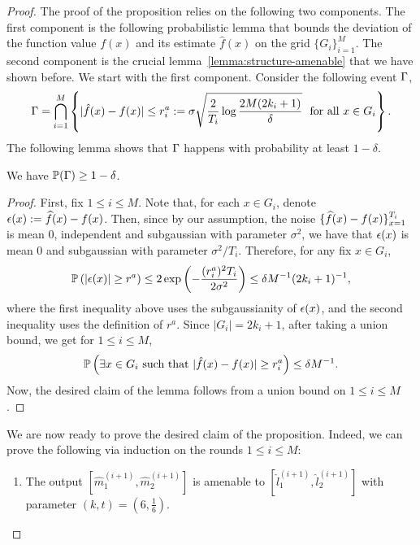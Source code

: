 \begin{proof}
The proof of the proposition relies on the following two components. The first 
component is the following probabilistic lemma that bounds the deviation of the 
function value $f(x)$ and its estimate $\hat{f}(x)$ on the grid $\{G_i\}_{i=1}^M$. 
The second component is the crucial lemma~\ref{lemma:structure-amenable} 
that we have shown before. We start with the first component. Consider the 
following event $\event$, 
\begin{equation*}
\event = \bigcap_{i=1}^M \left\{|\hat{f}(x) - f(x)| \leq r_i^a \defeq \sigma \sqrt{\frac{2}{T_i} 
	\log \frac{2M(2k_i + 1)}{\delta}}~~\text{for all $x\in G_i$}\right\}.
\end{equation*}
The following lemma shows that $\event$ happens with probability at least $1-\delta$. 
\begin{lemma}
We have $\P(\event) \geq 1-\delta$. 
\end{lemma}
\begin{proof}
First, fix $1\leq i\leq M$. Note that, for each $x \in G_i$, denote 
$\noise(x) \defeq \what{f}(x) - f(x)$.  Then, since by our assumption, 
the noise $\{\what{f}(x) - f(x)\}_{x=1}^{T_i}$ is mean $0$, independent 
and subgaussian with parameter $\sigma^2$, we have that $\noise(x)$ is mean $0$ 
and subgaussian with parameter $\sigma^2/T_i$. Therefore, for any fix $x\in G_i$, 
\begin{align*}
\P\left(|\noise(x)| \geq r^a \right) 
		\leq 2\exp\left(-\frac{(r_i^a)^2T_i}{2\sigma^2}\right) 
			\leq \delta M^{-1}(2k_i+1)^{-1}, 
\end{align*}
where the first inequality above uses the subgaussianity of $\noise(x)$, and 
the second inequality uses the definition of $r^a$. Since $|G_i| = 2k_i + 1$, 
after taking a union bound, we get for $1\leq i\leq M$, 
\begin{equation*}
\P \left(\exists x \in G_i~\text{such that}~|\hat{f}(x) - f(x)| \geq r_i^a\right) 
	\leq \delta M^{-1}.
\end{equation*} 
Now, the desired claim of the lemma follows from a union bound on $1\leq i\leq M$. 
\end{proof}
We are now ready to prove the desired claim of the proposition. Indeed, we can 
prove the following via induction on the rounds $1\leq i\leq M$: 
\begin{enumerate}
\item The output $[\hat{m}_1^{(i+1)}, \hat{m}_2^{(i+1)}]$ is amenable to  
	$[\hat{l}_1^{(i+1)}, \hat{l}_2^{(i+1)}]$ with parameter $(k, t) = \left(6, \frac{1}{6}\right)$.

\end{enumerate}
\end{proof}
